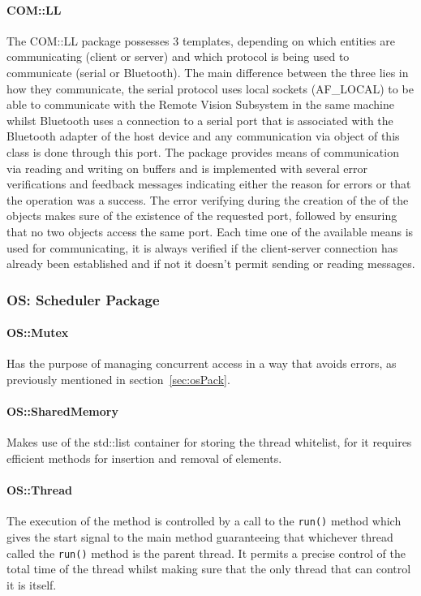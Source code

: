 \paragraph{COM::LL}
The COM::LL package possesses 3 templates, depending on which entities are communicating (client or server) and which protocol is being used to communicate (serial or Bluetooth). The main difference between the three lies in how they communicate, the serial protocol uses local sockets (AF\_LOCAL) to be able to communicate with the Remote Vision Subsystem in the same machine whilst Bluetooth uses a connection to a serial port that is associated with the Bluetooth adapter of the host device and any communication via object of this class is done through this port.
The package provides means of communication via reading and writing on buffers and is implemented with several error verifications and feedback messages indicating either the reason for errors or that the operation was a success. The error verifying during the creation of the of the objects makes sure of the existence of the requested port, followed by ensuring that no two objects access the same port. Each time one of the available means is used for communicating, it is always verified if the client-server connection has already been established and if not it doesn't permit sending or reading messages.
%

%
\subsubsection{OS: Scheduler Package}
\paragraph{OS::Mutex}
Has the purpose of managing concurrent access in a way that avoids errors, as previously mentioned in section~\ref{sec:osPack}.
\paragraph{OS::SharedMemory}
Makes use of the std::list container for storing the thread whitelist, for it requires efficient methods for insertion and removal of elements.
\paragraph{OS::Thread}
The execution of the method is controlled by a call to the \texttt{run()} method which gives the start signal to the main method guaranteeing that whichever thread called the \texttt{run()} method is the parent thread. It permits a precise control of the total time of the thread whilst making sure that the only thread that can control it is itself.
%
